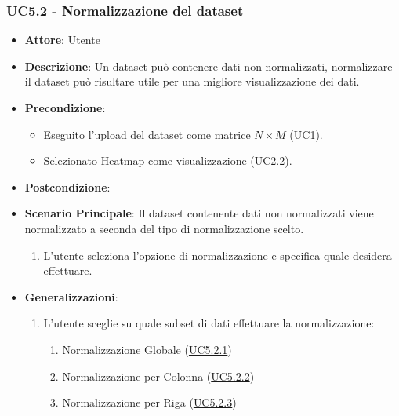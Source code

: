     \subsubsection{UC5.2 - Normalizzazione del dataset}
    \label{uc5.2}
    \begin{itemize}
    \item \textbf{Attore}: Utente
    \item \textbf{Descrizione}: Un dataset può contenere dati non normalizzati, normalizzare il dataset può risultare utile per una migliore visualizzazione dei dati.
    \item \textbf{Precondizione}: 
    \begin{itemize}
        \item Eseguito l'upload del dataset come matrice $N\times M$ (\hyperref[uc1]{UC1}).
        \item Selezionato Heatmap come visualizzazione (\hyperref[uc2.2]{UC2.2}).
    \end{itemize}  
    \item \textbf{Postcondizione}: 
    \item \textbf{Scenario Principale}: Il dataset contenente dati non normalizzati viene normalizzato a seconda del tipo di normalizzazione scelto.
    \begin{enumerate}
        \item L'utente seleziona l'opzione di normalizzazione e specifica quale desidera effettuare.
    \end{enumerate}  
    \item \textbf{Generalizzazioni}: 
     \begin{enumerate}
            \item L'utente sceglie su quale subset di dati effettuare la normalizzazione:
                \begin{enumerate}
                    \item Normalizzazione Globale (\hyperref[uc5.2.1]{UC5.2.1})
                    \item Normalizzazione per Colonna (\hyperref[uc5.2.2]{UC5.2.2})
                    \item Normalizzazione per Riga (\hyperref[uc5.2.3]{UC5.2.3})
                \end{enumerate}
        \end{enumerate}  
    \end{itemize}
    
